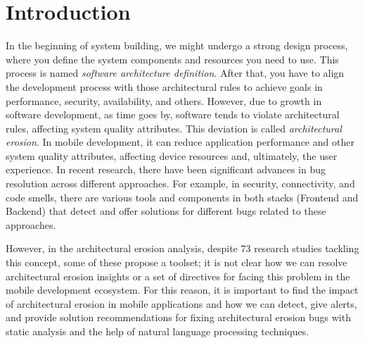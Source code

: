
\chapter{Introduction}
\label{cha:introduction}

In the beginning of system building, we might undergo a strong design process, where you define the system components and resources you need to use. This process is named \emph{software architecture definition}. After that, you have to align the development process with those architectural rules to achieve goals in performance, security, availability, and others.
However, due to growth in software development, as time goes by, software tends to violate architectural rules, affecting system quality attributes. This deviation is called \emph{architectural erosion}. In mobile development, it can reduce application performance and other system quality attributes, affecting device resources and, ultimately, the user experience.
In recent research, there have been significant advances in bug resolution across different approaches. For example, in security, connectivity, and code smells, there are various tools and components in both stacks (Frontend and Backend) that detect and offer solutions for different bugs related to these approaches.

However, in the architectural erosion analysis, despite 73 research studies tackling this concept, some of these propose a toolset; it is not clear how we can resolve architectural erosion insights or a set of directives for facing this problem in the mobile development ecosystem. For this reason, it is important to find the impact of architectural erosion in mobile applications and how we can detect, give alerts, and provide solution recommendations for fixing architectural erosion bugs with static analysis and the help of natural language processing techniques.


